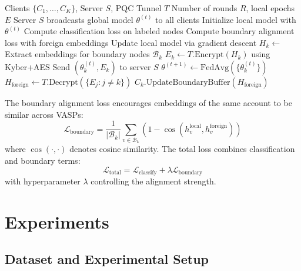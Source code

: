\documentclass[conference]{IEEEtran}
\begin{document}
\begin{algorithm}[htbp]
\caption{FedGraph-VASP Training Protocol}
\label{alg:fedgraph}
\begin{algorithmic}[1]
\REQUIRE Clients $\{C_1, \ldots, C_K\}$, Server $S$, PQC Tunnel $T$
\REQUIRE Number of rounds $R$, local epochs $E$
    \STATE Server $S$ broadcasts global model $\theta^{(t)}$ to all clients
        \STATE Initialize local model with $\theta^{(t)}$
            \STATE Compute classification loss on labeled nodes
            \STATE Compute boundary alignment loss with foreign embeddings
            \STATE Update local model via gradient descent
        \ENDFOR
        \STATE $H_k \leftarrow$ Extract embeddings for boundary nodes $\mathcal{B}_k$
        \STATE $E_k \leftarrow T.\text{Encrypt}(H_k)$ using Kyber+AES
        \STATE Send $(\theta_k^{(t)}, E_k)$ to server $S$
    \ENDFOR
    \STATE $\theta^{(t+1)} \leftarrow \text{FedAvg}(\{\theta_k^{(t)}\})$
        \STATE $H_{\text{foreign}} \leftarrow T.\text{Decrypt}(\{E_j : j \neq k\})$
        \STATE $C_k.\text{UpdateBoundaryBuffer}(H_{\text{foreign}})$
    \ENDFOR
\ENDFOR
\end{algorithmic}
\end{algorithm}

The boundary alignment loss encourages embeddings of the same account to be similar across VASPs:
\begin{equation}
\mathcal{L}_{\text{boundary}} = \frac{1}{|\mathcal{B}_k|} \sum_{v \in \mathcal{B}_k} \left(1 - \cos(h_v^{\text{local}}, h_v^{\text{foreign}})\right)
\end{equation}
where $\cos(\cdot, \cdot)$ denotes cosine similarity. The total loss combines classification and boundary terms:
\begin{equation}
\mathcal{L}_{\text{total}} = \mathcal{L}_{\text{classify}} + \lambda \mathcal{L}_{\text{boundary}}
\end{equation}
with hyperparameter $\lambda$ controlling the alignment strength.

\section{Experiments}

\subsection{Dataset and Experimental Setup}
\end{document}
